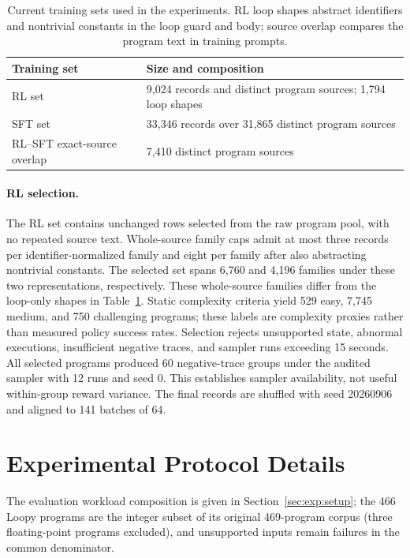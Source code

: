 \begin{table}[H]
\centering
\setlength{\tabcolsep}{5pt}
\begin{tabular}{lp{7.2cm}}
\toprule
\rowcolor{algobg}
Training set & Size and composition \\
\midrule
RL set & 9,024 records and distinct program sources; 1,794 loop shapes \\
SFT set & 33,346 records over 31,865 distinct program sources \\
RL--SFT exact-source overlap & 7,410 distinct program sources \\
\bottomrule
\end{tabular}
\caption{Current training sets used in the experiments.  RL loop shapes
abstract identifiers and nontrivial constants in the loop guard and body;
source overlap compares the program text in training prompts.}
\label{tab:training-sets}
\end{table}

\paragraph{RL selection.}
The RL set contains unchanged rows selected from the raw program pool, with
no repeated source text.  Whole-source family caps admit at most three
records per identifier-normalized family and eight per family after also
abstracting nontrivial constants.  The selected set spans 6,760 and 4,196
families under these two representations, respectively.  These whole-source
families differ from the loop-only shapes in Table~\ref{tab:training-sets}.
Static complexity criteria yield 529 easy, 7,745 medium, and 750 challenging
programs; these labels are complexity proxies rather than measured policy
success rates.  Selection rejects unsupported state, abnormal executions,
insufficient negative traces, and sampler runs exceeding 15 seconds.  All
selected programs produced 60 negative-trace groups under the audited sampler
with 12 runs and seed 0.  This establishes sampler availability, not useful
within-group reward variance.  The final records are shuffled with seed
20260906 and aligned to 141 batches of 64.

\section{Experimental Protocol Details}
\label{app:experimental-protocol}

The evaluation workload composition is given in
Section~\ref{sec:exp:setup}; the 466 Loopy programs are the integer subset
of its original 469-program corpus (three floating-point programs excluded),
and unsupported inputs remain failures in the common denominator.

